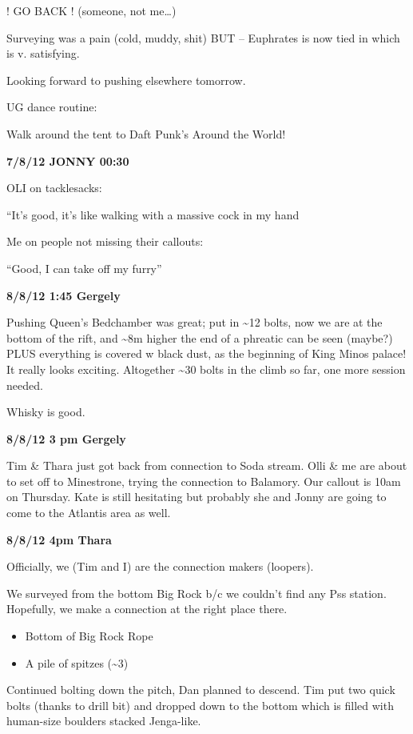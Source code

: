 ! GO BACK ! (someone, not me\ldots{})

Surveying was a pain (cold, muddy, shit) BUT -- Euphrates is now tied in
which is v. satisfying.

Looking forward to pushing elsewhere tomorrow.

UG dance routine:

Walk around the tent to Daft Punk's Around the World!

\textbf{7/8/12 JONNY 00:30}

OLI on tacklesacks:

``It's good, it's like walking with a massive cock in my hand

Me on people not missing their callouts:

``Good, I can take off my furry''

\textbf{8/8/12 1:45 Gergely}

Pushing Queen's Bedchamber was great; put in \textasciitilde{}12 bolts,
now we are at the bottom of the rift, and \textasciitilde{}8m higher the
end of a phreatic can be seen (maybe?) PLUS everything is covered w
black dust, as the beginning of King Minos palace! It really looks
exciting. Altogether \textasciitilde{}30 bolts in the climb so far, one
more session needed.

Whisky is good.

\textbf{8/8/12 3 pm Gergely}

Tim \& Thara just got back from connection to Soda stream. Olli \& me
are about to set off to Minestrone, trying the connection to Balamory.
Our callout is 10am on Thursday. Kate is still hesitating but probably
she and Jonny are going to come to the Atlantis area as well.

\textbf{8/8/12 4pm Thara}

Officially, we (Tim and I) are the connection makers (loopers).

We surveyed from the bottom Big Rock b/c we couldn't find any Pss
station. Hopefully, we make a connection at the right place there.

\begin{itemize}
\tightlist
\item
  Bottom of Big Rock Rope
\item
  A pile of spitzes (\textasciitilde{}3)
\end{itemize}

Continued bolting down the pitch, Dan planned to descend. Tim put two
quick bolts (thanks to drill bit) and dropped down to the bottom which
is filled with human-size boulders stacked Jenga-like.

